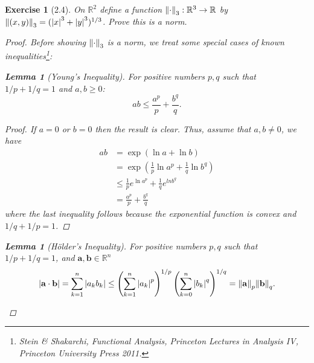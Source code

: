\documentclass[11pt]{article}
\newtheorem{lemma}[theorem]{Lemma}
\newtheorem{exercise}{Exercise}
\newcommand*{\myproofname}{Proof}
\newenvironment{subproof}[1][\myproofname]{\begin{proof}[#1]\renewcommand*{\qedsymbol}{$\mathbin{/\mkern-6mu/}$}}{\end{proof}}
\newcommand{\R}{\mathbb{R}}
\newcommand{\lp}{\left(}
\newcommand{\rp}{\right)}
\newcommand{\f}[2]{\frac{#1}{#2}}
\begin{document}
\begin{exercise}[2.4]
	On $\mathbb{R}^2$ define a function $\norm{\cdot}_3 : \R^3 \to \R$ by $\norm{(x,y)}_3 = (\abs{x}^3 + \abs{y}^3)^{1/3}$. Prove this is a norm.
	
	\begin{proof}
		Before showing $\norm{\cdot}_3$ is a norm, we treat some special cases of known inequalities\footnote{Stein \& Shakarchi, \textit{Functional Analysis, Princeton Lectures in Analysis IV}, Princeton University Press 2011.}:
		\begin{lemma}[Young's Inequality]
			For positive numbers $p,q$ such that $1/p + 1/q = 1$ and $a,b \geq 0$:
			\begin{equation*}
			ab \leq \f{a^p}{p} + \f{b^q}{q}.
			\end{equation*}
			
			\begin{subproof}
				If $a=0$ or $b=0$ then the result is clear. Thus, assume that $a,b\neq 0$, we have
				\begin{align*}
				ab &= \exp\lp\ln a + \ln b\rp \\ 
				&= \exp\lp\f{1}{p} \ln a^p + \f{1}{q} \ln b^q\rp\\
				&\leq \f{1}{p}e^{\ln a^p} + \f{1}{q}e^{ln b^q} \\
				&= \f{a^p}{p} + \f{b^q}{q} 
				\end{align*}
				where the last inequality follows because the exponential function is convex and $1/q + 1/p = 1$.
			\end{subproof}
		\end{lemma}
		
		\begin{lemma}[H\"{o}lder's Inequality]
			For positive numbers $p,q$ such that $1/p + 1/q = 1$, and $\mathbf{a},\mathbf{b} \in \R^n$
			\begin{equation*}
			\abs{\bf{a}\cdot \bf{b}} = \sum^n_{k=1} \abs{a_k b_k} \leq \lp \sum^n_{k=1}\abs{a_k}^p \rp^{1/p} \lp \sum^n_{k=0} \abs{b_k}^q \rp^{1/q} = \norm{\bf{a}}_p \norm{\bf{b}}_q.
			\end{equation*}
			

\end{lemma}
\end{proof}
\end{exercise}
\end{document}
